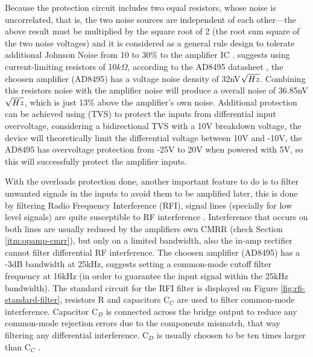 	Because the protection circuit includes two equal resistors, whose noise is uncorrelated, that is, the two noise sources are independent of each other—the above result must be multiplied by the square root of 2 (the root sum square of the two noise voltages) and it is considered as a general rule design to tolerate additional Johnson Noise from 10 to 30$\%$ to the amplifier IC \cite{sensors2000}. \cite{two-ways-thermocouple} suggests using current-limiting resistors of 10$k\Omega$, according to the AD8495 datasheet \cite{ad8495-datasheet}, the choosen amplifier (AD8495) has a voltage noise density of 32nV$\/ \sqrt{Hz}$. Combining this resistors noise with the amplifier noise will produce a overall noise of 36.85nV$\/\sqrt{Hz}$, which is just 13$\%$ above the amplifier's own noise. Additional protection can be achieved using (TVS) to protect the inputs from differential input overvoltage, considering a bidirectional TVS with a 10V breakdown voltage, the device will theoretically limit the differential voltage between 10V and -10V, the AD8495 has overvoltage protection from -25V to 20V when powered with 5V, so this will successfully protect the amplifier inputs. 
	\par
	With the overloads protection done, another important feature to do is to filter unwanted signals in the inputs to avoid them to be amplified later, this is done by filtering Radio Frequency Interference (RFI), signal lines (specially for low level signals) are quite susceptible to RF interference \cite{analogDevDesignersGuide}. Interference that occurs on both lines are usually reduced by the amplifiers own CMRR (check Section \ref{itm:opamp-cmrr}), but only on a limited bandwidth, also the in-amp rectifier cannot filter differential RF interference. The choosen amplifier (AD8495) has a -3dB bandwidth at 25kHz, \cite{two-ways-thermocouple} suggests setting a common-mode cutoff filter frequency at 16kHz (in order to guarantee the input signal within the 25kHz bandwidth). The standard circuit for the RFI filter is displayed on Figure \ref{fig:rfi-standard-filter}, resistors R and capacitors C$_{C}$ are used to filter common-mode interference. Capacitor C$_{D}$ is connected across the bridge output to reduce any common-mode rejection errors due to the components mismatch, that way filtering any differential interference. C$_{D}$ is usually choosen to be ten times larger than C$_{C}$ \cite{ad8495-datasheet}.
	
